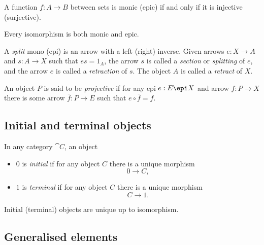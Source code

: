 \documentclass{article}
\begin{document}
\begin{proposition}[Awodey 2.2]
    A function $f:A\to B$ between sets is monic (epic) if and only if it is injective (surjective).
\end{proposition}

\begin{proposition}[Awodey 2.6]
    Every isomorphism is both monic and epic.
\end{proposition}

\begin{definition}[Awodey 2.7]
    A \emph{split} mono (epi) is an arrow with a left (right) inverse. Given
    arrows $e:X\to A$ and $s:A\to X$ such that $es=1_A$, the arrow $s$ is called
    a \emph{section} or \emph{splitting} of $e$, and the arrow $e$ is called a
    \emph{retraction} of $s$. The object $A$ is called a \emph{retract} of $X$.
\end{definition}

\begin{definition}
    An object $P$ is said to be \emph{projective} if for any epi $e:E\epi X$
    and arrow $f:P\to X$ there is some arrow $\bar f:P\to E$ such that
    $e\circ \bar f = f$.
\end{definition}

\subsection{Initial and terminal objects}

\begin{definition}[Awodey 2.9]
    In any category $\cat C$, an object
    \begin{itemize}
        \item $0$ is \emph{initial} if for any object $C$ there is a unique morphism
        \[0\to C,\]
        \item $1$ is \emph{terminal} if for any object $C$ there is a unique morphism
        \[C\to 1.\]
    \end{itemize}
\end{definition}

\begin{proposition}[Awodey 2.10]
    Initial (terminal) objects are unique up to isomorphism.    
\end{proposition}

\subsection{Generalised elements}
\end{document}
